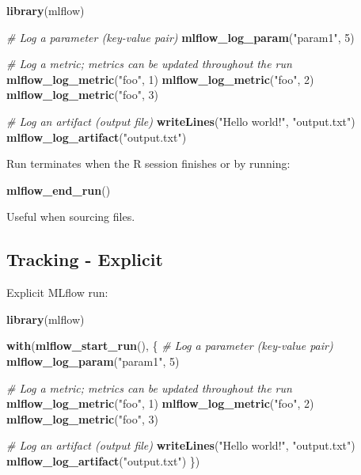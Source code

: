 \documentclass[]{article}
\newenvironment{Shaded}{\begin{snugshade}}{\end{snugshade}}
\newcommand{\CommentTok}[1]{\textcolor[rgb]{0.56,0.35,0.01}{\textit{#1}}}
\newcommand{\DecValTok}[1]{\textcolor[rgb]{0.00,0.00,0.81}{#1}}
\newcommand{\KeywordTok}[1]{\textcolor[rgb]{0.13,0.29,0.53}{\textbf{#1}}}
\newcommand{\NormalTok}[1]{#1}
\newcommand{\StringTok}[1]{\textcolor[rgb]{0.31,0.60,0.02}{#1}}
\begin{document}
\begin{Shaded}
\begin{Highlighting}[]
\KeywordTok{library}\NormalTok{(mlflow)}

\CommentTok{# Log a parameter (key-value pair)}
\KeywordTok{mlflow_log_param}\NormalTok{(}\StringTok{"param1"}\NormalTok{, }\DecValTok{5}\NormalTok{)}

\CommentTok{# Log a metric; metrics can be updated throughout the run}
\KeywordTok{mlflow_log_metric}\NormalTok{(}\StringTok{"foo"}\NormalTok{, }\DecValTok{1}\NormalTok{)}
\KeywordTok{mlflow_log_metric}\NormalTok{(}\StringTok{"foo"}\NormalTok{, }\DecValTok{2}\NormalTok{)}
\KeywordTok{mlflow_log_metric}\NormalTok{(}\StringTok{"foo"}\NormalTok{, }\DecValTok{3}\NormalTok{)}

\CommentTok{# Log an artifact (output file)}
\KeywordTok{writeLines}\NormalTok{(}\StringTok{"Hello world!"}\NormalTok{, }\StringTok{"output.txt"}\NormalTok{)}
\KeywordTok{mlflow_log_artifact}\NormalTok{(}\StringTok{"output.txt"}\NormalTok{)}
\end{Highlighting}
\end{Shaded}

Run terminates when the R session finishes or by running:

\begin{Shaded}
\begin{Highlighting}[]
\KeywordTok{mlflow_end_run}\NormalTok{()}
\end{Highlighting}
\end{Shaded}

Useful when sourcing files.

\hypertarget{tracking---explicit}{%
\subsection{Tracking - Explicit}\label{tracking---explicit}}

Explicit MLflow run:

\begin{Shaded}
\begin{Highlighting}[]
\KeywordTok{library}\NormalTok{(mlflow)}

\KeywordTok{with}\NormalTok{(}\KeywordTok{mlflow_start_run}\NormalTok{(), \{}
  \CommentTok{# Log a parameter (key-value pair)}
  \KeywordTok{mlflow_log_param}\NormalTok{(}\StringTok{"param1"}\NormalTok{, }\DecValTok{5}\NormalTok{)}
  
  \CommentTok{# Log a metric; metrics can be updated throughout the run}
  \KeywordTok{mlflow_log_metric}\NormalTok{(}\StringTok{"foo"}\NormalTok{, }\DecValTok{1}\NormalTok{)}
  \KeywordTok{mlflow_log_metric}\NormalTok{(}\StringTok{"foo"}\NormalTok{, }\DecValTok{2}\NormalTok{)}
  \KeywordTok{mlflow_log_metric}\NormalTok{(}\StringTok{"foo"}\NormalTok{, }\DecValTok{3}\NormalTok{)}
  
  \CommentTok{# Log an artifact (output file)}
  \KeywordTok{writeLines}\NormalTok{(}\StringTok{"Hello world!"}\NormalTok{, }\StringTok{"output.txt"}\NormalTok{)}
  \KeywordTok{mlflow_log_artifact}\NormalTok{(}\StringTok{"output.txt"}\NormalTok{)}
\NormalTok{\})}
\end{Highlighting}
\end{Shaded}
\end{document}
